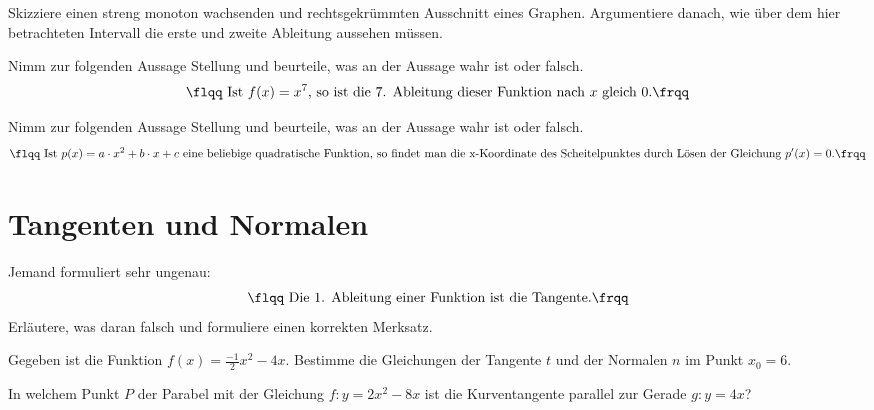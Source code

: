 \documentclass[11pt]{exam}
\begin{document}
\begin{questions}


\question[2]
Skizziere einen streng monoton wachsenden und rechtsgekrümmten Ausschnitt eines Graphen. Argumentiere danach, wie über dem hier betrachteten Intervall die erste und zweite Ableitung aussehen müssen.


\question[2] %
Nimm zur folgenden Aussage Stellung und beurteile, was an der Aussage wahr ist oder falsch.
\[\text{\flqq Ist $f(x)=x^7$, so ist die 7. Ableitung dieser Funktion nach $x$ gleich 0.\frqq}\]


\question[2] %
Nimm zur folgenden Aussage Stellung und beurteile, was an der Aussage wahr ist oder falsch.
\[\text{\flqq Ist $p(x)=a\*x^2+b\*x+c$ eine beliebige quadratische Funktion, so findet man die x-Koordinate des Scheitelpunktes durch Lösen der Gleichung $p'(x)=0$.\frqq}\]


\newpage
\section{Tangenten und Normalen}
\question[2]
Jemand formuliert sehr ungenau: \[\text{\flqq Die 1. Ableitung einer Funktion ist die Tangente.\frqq}\] Erläutere, was daran falsch und formuliere einen korrekten Merksatz.


\question[4]
Gegeben ist die Funktion $f(x)=\frac{-1}{2}x^2-4x$. Bestimme die Gleichungen der Tangente $t$ und der Normalen $n$ im Punkt $x_0=6$.


\question[4] %
In welchem Punkt $P$ der Parabel mit der Gleichung $f:y=2x^2-8x$ ist die Kurventangente parallel zur Gerade $g:y=4x$?


\end{questions}
\end{document}
